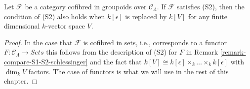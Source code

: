 %
\begin{lemma}
\label{lemma-S2-extensions}
Let $\mathcal{F}$ be a category cofibred in groupoids over
$\mathcal{C}_\Lambda$. If $\mathcal{F}$ satisfies (S2), then the
condition of (S2) also holds when $k[\epsilon]$ is replaced by $k[V]$
for any finite dimensional $k$-vector space $V$.
\end{lemma}

\begin{proof}
In the case that $\mathcal{F}$ is cofibred in sets, i.e., corresponds
to a functor $F : \mathcal{C}_\Lambda \to \textit{Sets}$ this follows
from the description of (S2) for $F$ in
Remark \ref{remark-compare-S1-S2-schlessinger}
and the fact that
$k[V] \cong k[\epsilon] \times_k \ldots \times_k k[\epsilon]$
with $\dim_k V$ factors. The case of functors is what we will use in
the rest of this chapter.


\end{proof}

